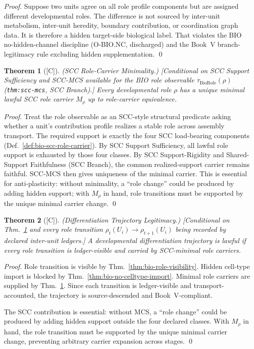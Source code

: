 \documentclass[12pt,oneside]{amsbook}
\theoremstyle{plain}
\newtheorem{theorem}{Theorem}[section]
\theoremstyle{definition}
\theoremstyle{remark}
\newcommand{\status}[1]{\textup{[#1]}}
\begin{document}
\begin{proof}
Suppose two units agree on all role profile components but are assigned
different developmental roles. The difference is not sourced by
inter-unit metabolism, inter-unit heredity, boundary contribution, or
coordination graph data. It is therefore a hidden target-side
biological label. That violates the BIO no-hidden-channel discipline
(O-BIO.NC, discharged) and the Book~V branch-legitimacy rule excluding
hidden supplementation.
\qed
\end{proof}

\begin{theorem}[\status{C}]\label{thm:bio-role-MCS}
\textup{(SCC Role-Carrier Minimality.)}
\textup{[Conditional on SCC Support Sufficiency and SCC-MCS
available for the BIO role observable
$\tau_{\mathrm{BioRole}}(\rho)$
(\texttt{thm:scc-mcs}, SCC Branch).]}
Every developmental role $\rho$ has a unique minimal lawful SCC
role carrier $M_\rho$ up to role-carrier equivalence.
\end{theorem}

\begin{proof}
Treat the role observable as an SCC-style structural predicate
asking whether a unit's contribution profile realizes a stable
role across assembly transport. The required support is exactly
the four SCC load-bearing components
(Def.~\ref{def:bio-scc-role-carrier}). By SCC Support Sufficiency,
all lawful role support is exhausted by those four classes. By
SCC Support-Rigidity and Shared-Support Faithfulness (SCC Branch),
the common realized-support carrier remains faithful. SCC-MCS then
gives uniqueness of the minimal carrier.
This is essential for anti-plasticity: without minimality, a
``role change'' could be produced by adding hidden support;
with $M_\rho$ in hand, role transitions must be supported by the
unique minimal carrier change.
\qed
\end{proof}

\begin{theorem}[\status{C}]\label{thm:bio-dev-trajectory-legitimacy}
\textup{(Differentiation Trajectory Legitimacy.)}
\textup{[Conditional on Thm.~\ref{thm:bio-role-MCS} and every role
transition $\rho_t(U_i) \to \rho_{t+1}(U_i)$ being recorded by
declared inter-unit ledgers.]}
A developmental differentiation trajectory is lawful if every role
transition is ledger-visible and carried by SCC-minimal role carriers.
\end{theorem}

\begin{proof}
Role transition is visible by Thm.~\ref{thm:bio-role-visibility}.
Hidden cell-type import is blocked by Thm.~\ref{thm:bio-no-celltype-import}.
Minimal role carriers are supplied by Thm.~\ref{thm:bio-role-MCS}.
Since each transition is ledger-visible and transport-accounted, the
trajectory is source-descended and Book~V-compliant.

The SCC contribution is essential: without MCS, a ``role change''
could be produced by adding hidden support outside the four declared
classes. With $M_\rho$ in hand, the role transition must be
supported by the unique minimal carrier change, preventing arbitrary
carrier expansion across stages.
\qed
\end{proof}
\end{document}
